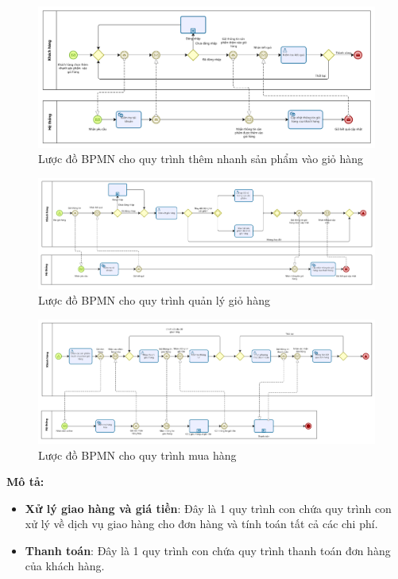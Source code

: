     \begin{figure}[!htp]
        \centering
        \includegraphics[width=15cm]{img/BPMN/customer_buy/customer_add_fast.png}
        \newline
        \caption{Lược đồ BPMN cho quy trình thêm nhanh sản phẩm vào giỏ hàng}
    \end{figure}
    \begin{figure}[!htp]
        \centering
        \includegraphics[width=15cm]{img/BPMN/customer_buy/customer_cart.png}
        \newline
        \caption{Lược đồ BPMN cho quy trình quản lý giỏ hàng}
    \end{figure}
    \begin{figure}[!htp]
        \centering
        \includegraphics[width=15cm]{img/BPMN/customer_buy/customer_buy_order.png}
        \newline
        \caption{Lược đồ BPMN cho quy trình mua hàng}
    \end{figure}
    \newpage
    \textbf{Mô tả:}
    \begin{itemize}
        \item \textbf{Xử lý giao hàng và giá tiền}: Đây là 1 quy trình con chứa quy trình con xử lý về dịch vụ giao hàng cho đơn hàng và tính toán tất cả các chi phí.
        \item \textbf{Thanh toán}: Đây là 1 quy trình con chứa quy trình thanh toán đơn hàng của khách hàng.
    \end{itemize}
